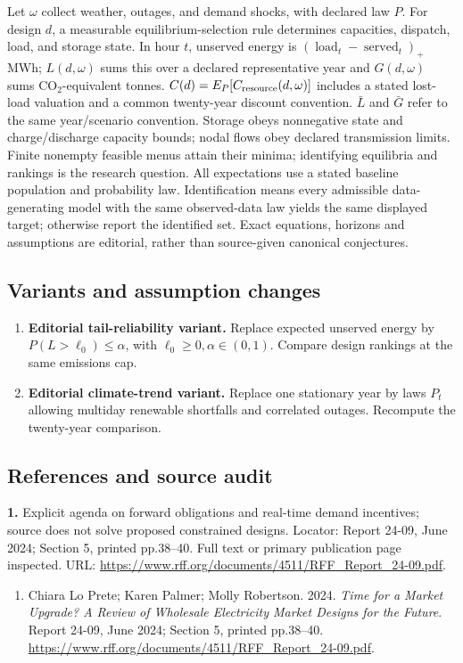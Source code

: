 \documentclass[11pt,a4paper]{article}
\begin{document}
Let \(\omega\) collect weather, outages, and demand shocks, with declared law \(P\). For design \(d\), a measurable equilibrium-selection rule determines capacities, dispatch, load, and storage state. In hour \(t\), unserved energy is \((\operatorname{load}_t-\operatorname{served}_t)_+\) MWh; \(L(d,\omega)\) sums this over a declared representative year and \(G(d,\omega)\) sums CO\(_2\)-equivalent tonnes. \(C(d)=E_P[C_{\rm resource}(d,\omega)]\) includes a stated lost-load valuation and a common twenty-year discount convention. \(\bar L\) and \(\bar G\) refer to the same year/scenario convention. Storage obeys nonnegative state and charge/discharge capacity bounds; nodal flows obey declared transmission limits. Finite nonempty feasible menus attain their minima; identifying equilibria and rankings is the research question. All expectations use a stated baseline population and probability law. Identification means every admissible data-generating model with the same observed-data law yields the same displayed target; otherwise report the identified set. Exact equations, horizons and assumptions are editorial, rather than source-given canonical conjectures.
\subsection*{Variants and assumption changes}
\begin{enumerate}
\item \textbf{Editorial tail-reliability variant.} Replace expected unserved energy by \(P(L>\ell_0)\leq\alpha\), with \(\ell_0\geq0,\alpha\in(0,1)\). Compare design rankings at the same emissions cap.
\item \textbf{Editorial climate-trend variant.} Replace one stationary year by laws \(P_t\) allowing multiday renewable shortfalls and correlated outages. Recompute the twenty-year comparison.
\end{enumerate}
\subsection*{References and source audit}
\textbf{1.} Explicit agenda on forward obligations and real-time demand incentives; source does not solve proposed constrained designs. Locator: Report 24-09, June 2024; Section 5, printed pp.38–40. Full text or primary publication page inspected. URL: \url{https://www.rff.org/documents/4511/RFF_Report_24-09.pdf}.
\begin{enumerate}\raggedright
\item\hypertarget{definitions:source:30007719:1}{} Chiara Lo Prete; Karen Palmer; Molly Robertson. 2024. \emph{Time for a Market Upgrade? A Review of Wholesale Electricity Market Designs for the Future}. Report 24-09, June 2024; Section 5, printed pp.38–40.
\url{https://www.rff.org/documents/4511/RFF_Report_24-09.pdf}.
\end{enumerate}
\end{document}
